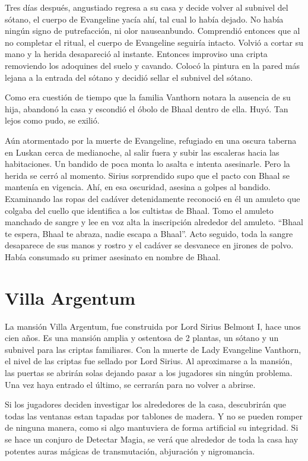 \documentclass[10pt,twoside,twocolumn,openany]{dndbook}
\begin{document}
Tres días después, angustiado regresa a su casa y decide volver al subnivel del sótano, el cuerpo 
de Evangeline yacía ahí, tal cual lo había dejado. No había ningún signo de putrefacción, ni olor 
nauseanbundo. Comprendió entonces que al no completar el ritual, el cuerpo de Evangeline seguiría 
intacto. Volvió a cortar su mano y la herida desapareció al instante. Entonces improviso una 
cripta removiendo los adoquines del suelo y cavando. Colocó la pintura en la pared más lejana a 
la entrada del sótano y decidió sellar el subnivel del sótano.

Como era cuestión de tiempo que la familia Vanthorn notara la ausencia de su hija, abandonó la 
casa y escondió el óbolo de Bhaal dentro de ella. Huyó. Tan lejos como pudo, se exilió. 

Aún atormentado por la muerte de Evangeline, refugiado en una oscura taberna en Luskan cerca
de medianoche, al salir fuera y subir las escaleras hacia las habitaciones. Un bandido de poca 
monta lo asalta e intenta asesinarle. Pero la herida se cerró al momento. Sirius sorprendido supo 
que el pacto con Bhaal se mantenía en vigencia. Ahí, en esa oscuridad, asesina a golpes al bandido.
Examinando las ropas del cadáver detenidamente reconoció en él un amuleto que colgaba del cuello
que identifica a los cultistas de Bhaal. Tomo el amuleto manchado de sangre y lee en voz alta 
la inscripción alrededor del amuleto. “Bhaal te espera, Bhaal te abraza, nadie escapa a Bhaal”.
Acto seguido, toda la sangre desaparece de sus manos y rostro y el cadáver se desvanece en jirones 
de polvo. Había consumado su primer asesinato en nombre de Bhaal.

\section{Villa Argentum}

La mansión Villa Argentum, fue construida por Lord Sirius Belmont I, hace unos cien años. Es una 
mansión amplia y ostentosa de 2 plantas, un sótano y un subnivel para las criptas familiares.
Con la muerte de Lady Evangeline Vanthorn, el nivel de las criptas fue sellado por Lord Sirius.
Al aproximarse a la mansión, las puertas se abrirán solas dejando pasar a los jugadores sin ningún 
problema. Una vez haya entrado el último, se cerrarán para no volver a abrirse.

Si los jugadores deciden investigar los alrededores de la casa, descubrirán que todas las ventanas
estan tapadas por tablones de madera. Y no se pueden romper de ninguna manera, como si algo 
mantuviera de forma artificial su integridad. Si se hace un conjuro de Detectar Magia, se verá que 
alrededor de toda la casa hay potentes auras mágicas de transmutación, abjuración y nigromancia. 
\end{document}
